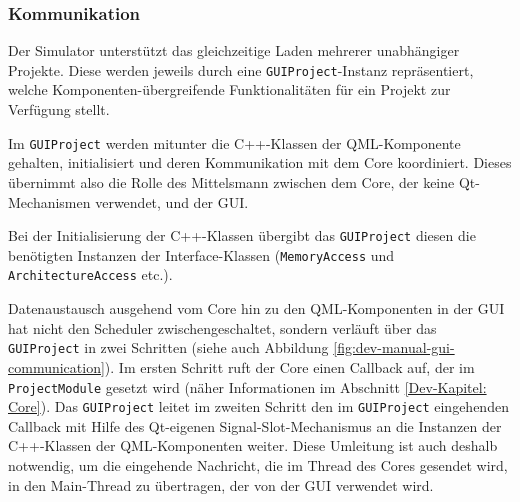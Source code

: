 \subsubsection{Kommunikation}
\label{gui-kommunikation}

Der Simulator unterstützt das gleichzeitige Laden mehrerer unabhängiger
Projekte. Diese werden jeweils durch eine \texttt{GUIProject}-Instanz
repräsentiert, welche Komponenten-über\-grei\-fen\-de Funktionalitäten für ein
Projekt zur Verfügung stellt.

Im \texttt{GUIProject} werden mitunter die C++-Klassen der QML-Komponente
gehalten, initialisiert und deren Kommunikation mit dem Core koordiniert.
Dieses übernimmt also die Rolle des Mittelsmann zwischen dem Core, der keine
Qt-Mechanismen verwendet, und der GUI.

Bei der Initialisierung der C++-Klassen übergibt das \texttt{GUIProject} diesen
die benötigten Instanzen der Interface-Klassen (\texttt{MemoryAccess} und
\texttt{ArchitectureAccess} etc.).

Datenaustausch ausgehend vom Core hin zu den QML-Komponenten in der GUI hat
nicht den Scheduler zwischengeschaltet, sondern verläuft über das
\texttt{GUIProject} in zwei Schritten (siehe auch Abbildung
\ref{fig:dev-manual-gui-communication}). Im ersten Schritt ruft der Core einen
Callback auf, der im \texttt{ProjectModule} gesetzt wird (näher Informationen im
Abschnitt \ref{Dev-Kapitel: Core}). Das \texttt{GUIProject} leitet im zweiten
Schritt den im \texttt{GUIProject} eingehenden Callback mit Hilfe des Qt-eigenen
Signal-Slot-Mechanismus an die Instanzen der C++-Klassen der QML-Komponenten
weiter. Diese Umleitung ist auch deshalb notwendig, um die eingehende Nachricht,
die im Thread des Cores gesendet wird, in den Main-Thread zu übertragen, der von
der GUI verwendet wird.

